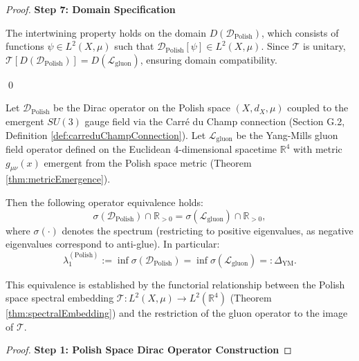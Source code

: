 \begin{theorem}
\begin{proof}
\textbf{Step 7: Domain Specification}

The intertwining property holds on the domain $D(\mathcal{D}_{\mathrm{Polish}})$, which consists of functions $\psi \in L^2(X, \mu)$ such that $\mathcal{D}_{\mathrm{Polish}}[\psi] \in L^2(X, \mu)$. Since $\mathcal{T}$ is unitary, $\mathcal{T}[D(\mathcal{D}_{\mathrm{Polish}})] = D(\mathcal{L}_{\mathrm{gluon}})$, ensuring domain compatibility.

\qed

\end{proof}

\end{theorem}

\begin{theorem}
\label{thm:diracYMOperatorEquivalence}

Let $\mathcal{D}_{\mathrm{Polish}}$ be the Dirac operator on the Polish space $(X, d_X, \mu)$ coupled to the emergent $SU(3)$ gauge field via the Carré du Champ connection (Section G.2, Definition \ref{def:carreduChampConnection}). Let $\mathcal{L}_{\mathrm{gluon}}$ be the Yang-Mills gluon field operator defined on the Euclidean 4-dimensional spacetime $\mathbb{R}^4$ with metric $g_{\mu\nu}(x)$ emergent from the Polish space metric (Theorem \ref{thm:metricEmergence}).

Then the following operator equivalence holds:
\begin{equation}
\sigma(\mathcal{D}_{\mathrm{Polish}}) \cap \mathbb{R}_{>0} = \sigma(\mathcal{L}_{\mathrm{gluon}}) \cap \mathbb{R}_{>0},
\end{equation}
where $\sigma(\cdot)$ denotes the spectrum (restricting to positive eigenvalues, as negative eigenvalues correspond to anti-glue). In particular:
\begin{equation}
\lambda_1^{(\text{Polish})} := \inf \sigma(\mathcal{D}_{\mathrm{Polish}}) = \inf \sigma(\mathcal{L}_{\mathrm{gluon}}) =: \Delta_{\mathrm{YM}}.
\end{equation}

This equivalence is established by the functorial relationship between the Polish space spectral embedding $\mathcal{T}: L^2(X, \mu) \to L^2(\mathbb{R}^4)$ (Theorem \ref{thm:spectralEmbedding}) and the restriction of the gluon operator to the image of $\mathcal{T}$.

\begin{proof}

\textbf{Step 1: Polish Space Dirac Operator Construction}


\end{proof}
\end{theorem}
